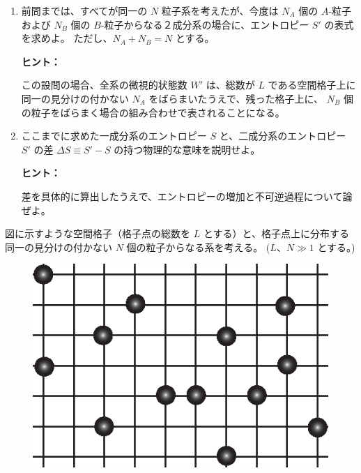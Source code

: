 \documentclass[uplatex,dvipdfmx,a4paper,11pt]{jsarticle}
\begin{document}
\begin{enumerate}
\color{black}

\item
前問までは、すべてが同一の $N$ 粒子系を考えたが、今度は $N_A$ 個の $A$-粒子および $N_B$ 個の $B$-粒子からなる２成分系の場合に、エントロピー $S'$ の表式を求めよ。
ただし、$N_A + N_B = N$ とする。

\begin{itembox}[l]{{\bf ヒント：}}

この設問の場合、全系の微視的状態数 $W'$ は、総数が $L$ である空間格子上に同一の見分けの付かない $N_A$ をばらまいたうえで、残った格子上に、
$N_B$ 個の粒子をばらまく場合の組み合わせで表されることになる。

\end{itembox}

\item
ここまでに求めた一成分系のエントロピー $S$ と、二成分系のエントロピー $S'$ の差 $\Delta S \equiv S' - S$ の持つ物理的な意味を説明せよ。

\begin{itembox}[l]{{\bf ヒント：}}

差を具体的に算出したうえで、エントロピーの増加と不可逆過程について論ぜよ。

\end{itembox}

\color{black}

\end{enumerate}

\newpage

図に示すような空間格子（格子点の総数を $L$ とする）と、格子点上に分布する同一の見分けの付かない $N$ 個の粒子からなる系を考える。
($L$、$N \gg 1$ とする。) 
%
\begin{figure}[h]
  \begin{center}
    \includegraphics{./figures/FIG_LatticeModel.eps}
  \end{center}
\end{figure}
%
\end{document}
